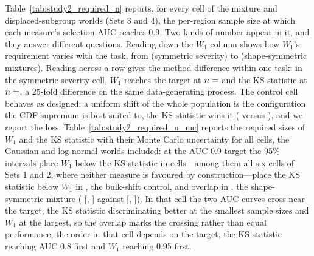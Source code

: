 \documentclass[AMA,Times1COL]{WileyNJDv5}
\begin{document}
Table~\ref{tab:study2_required_n} reports, for every cell of the mixture and displaced-subgroup worlds (Sets 3 and 4), the per-region sample size at which each measure's selection AUC reaches 0.9. Two kinds of number appear in it, and they answer different questions. Reading down the $W_1$ column shows how $W_1$'s requirement varies with the task, from  (symmetric severity) to  (shape-symmetric mixtures). Reading across a row gives the method difference within one task: in the symmetric-severity cell, $W_1$ reaches the target at $n = \numval{reqnW1Set4symsevB}$ and the KS statistic at $n = \numval{reqnKSSet4symsev}$, a 25-fold difference on the same data-generating process. The control cell behaves as designed: a uniform shift of the whole population is the configuration the CDF supremum is best suited to, the KS statistic wins it ( versus ), and we report the loss. Table~\ref{tab:study2_required_n_mc} reports the required sizes of $W_1$ and the KS statistic with their Monte Carlo uncertainty for all  cells, the Gaussian and log-normal worlds included: at the AUC 0.9 target the 95\% intervals place $W_1$ below the KS statistic in  cells---among them all six cells of Sets 1 and 2, where neither measure is favoured by construction---place the KS statistic below $W_1$ in , the bulk-shift control, and overlap in , the shape-symmetric mixture ( [, ] against  [, ]). In that cell the two AUC curves cross near the target, the KS statistic discriminating better at the smallest sample sizes and $W_1$ at the largest, so the overlap marks the crossing rather than equal performance; the order in that cell depends on the target, the KS statistic reaching AUC 0.8 first and $W_1$ reaching 0.95 first.
\end{document}
